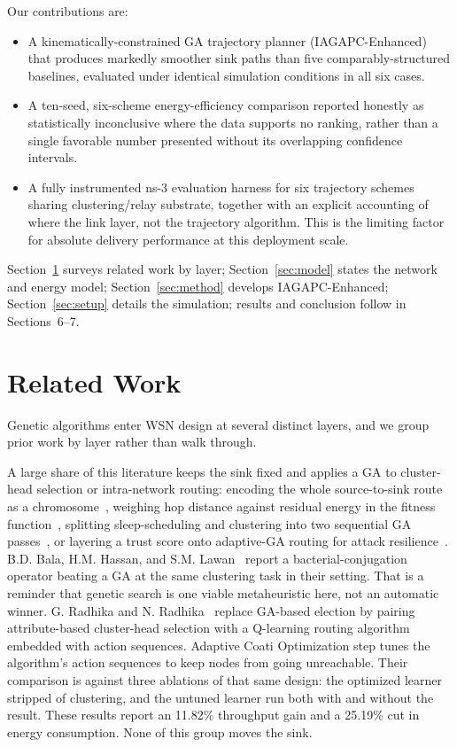 \documentclass[runningheads]{llncs}
\begin{document}
Our contributions are:
\begin{itemize}
\item A kinematically-constrained GA trajectory planner
      (IAGAPC-Enhanced) that produces markedly smoother sink paths than five
      comparably-structured baselines, evaluated under identical simulation
      conditions in all six cases.
\item A ten-seed, six-scheme energy-efficiency comparison reported
      honestly as statistically inconclusive where the data supports no
      ranking, rather than a single favorable number presented without its
      overlapping confidence intervals.
\item A fully instrumented ns-3 evaluation harness for six trajectory
      schemes sharing clustering/relay substrate, together with an
      explicit accounting of where the link layer, not the trajectory
      algorithm. This is the limiting factor for absolute delivery performance at
      this deployment scale.
\end{itemize}

Section~\ref{sec:related} surveys related work by layer; Section~\ref{sec:model}
states the network and energy model; Section~\ref{sec:method} develops
IAGAPC-Enhanced; Section~\ref{sec:setup} details the simulation; results
and conclusion follow in Sections~6--7.

\section{Related Work}
\label{sec:related}

Genetic algorithms enter WSN design at several distinct layers, and we
group prior work by layer rather than walk through.

A large share of
this literature keeps the sink fixed and applies a GA to cluster-head
selection or intra-network routing: encoding the whole
source-to-sink route as a chromosome~\cite{kowsalya2020cdarga}, weighing
hop distance against residual energy in the fitness
function~\cite{muthukkumar2022gaemc}, splitting sleep-scheduling and
clustering into two sequential GA passes~\cite{abbas2025twophase}, or
layering a trust score onto adaptive-GA routing for attack
resilience~\cite{han2022taga}. B.D. Bala, H.M. Hassan, and S.M. Lawan~\cite{bala2024leachm} report a
bacterial-conjugation operator beating a GA at the same clustering task in
their setting. That is a reminder that genetic search is one viable
metaheuristic here, not an automatic winner. G. Radhika and N.
Radhika~\cite{radhikag2025qlearning} replace GA-based election by
pairing attribute-based cluster-head selection with a Q-learning routing
algorithm embedded with action sequences. Adaptive Coati Optimization step tunes the algorithm's action
sequences to keep nodes from going unreachable. Their comparison is against
three ablations of that same design: the optimized learner stripped of
clustering, and the untuned learner run both with and without the result. These results 
report an 11.82\% throughput gain and a 25.19\% cut in
energy consumption. None of this group moves the sink.
\end{document}

